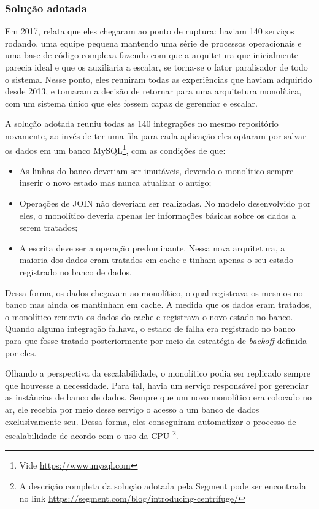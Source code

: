 \subsubsection{Solução adotada}

Em 2017,  relata que eles chegaram ao ponto de
ruptura: haviam 140 serviços rodando, uma equipe pequena mantendo uma série de processos
operacionais e uma base de código complexa fazendo com que a arquitetura que inicialmente parecia
ideal e que os auxiliaria a escalar, se torna-se o fator paralisador de todo o sistema. Nesse ponto,
eles reuniram todas as experiências que haviam adquirido desde 2013, e tomaram a decisão de retornar
para uma arquitetura monolítica, com um sistema único que eles fossem capaz de gerenciar e escalar.

A solução adotada reuniu todas as 140 integrações no mesmo repositório novamente, ao invés de ter
uma fila para cada aplicação eles optaram por salvar os dados em um banco MySQL\footnote{Vide
\url{https://www.mysql.com}}, com as condições de que:

\begin{itemize}
    \item As linhas do banco deveriam ser imutáveis, devendo o monolítico sempre inserir o novo
        estado mas nunca atualizar o antigo;
    \item Operações de JOIN não deveriam ser realizadas. No modelo desenvolvido por eles, o
        monolítico deveria apenas ler informações básicas sobre os dados a serem tratados;
    \item A escrita deve ser a operação predominante. Nessa nova arquitetura, a maioria dos dados
        eram tratados em cache e tinham apenas o seu estado registrado no banco de dados.
\end{itemize}

Dessa forma, os dados chegavam ao monolítico, o qual registrava os mesmos no banco mas ainda os
mantinham em cache. A medida que os dados eram tratados, o monolítico removia os dados do cache e
registrava o novo estado no banco. Quando alguma integração falhava, o estado de falha era
registrado no banco para que fosse tratado posteriormente por meio da estratégia de \textit{backoff}
definida por eles.

Olhando a perspectiva da escalabilidade, o monolítico podia ser replicado sempre que houvesse a
necessidade. Para tal, havia um serviço responsável por gerenciar as instâncias de banco de dados.
Sempre que um novo monolítico era colocado no ar, ele recebia por meio desse serviço o acesso a um
banco de dados exclusivamente seu. Dessa forma, eles conseguiram automatizar o processo de
escalabilidade de acordo com o uso da CPU \cite{Segment2018:Centrifuge}\footnote{A descrição
completa da solução adotada pela Segment pode ser encontrada no link \url{https://segment.com/blog/introducing-centrifuge/}}.

